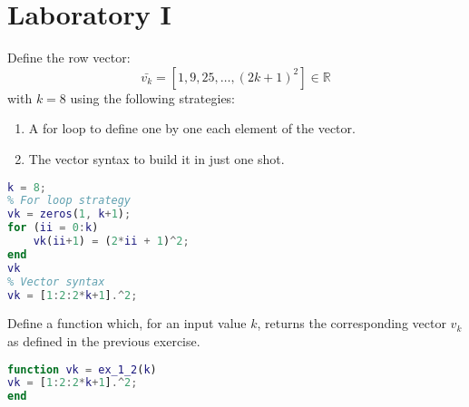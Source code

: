 \documentclass[12pt, a4paper]{report}
\newtheorem[style=M,bodystyle=\normalfont]{theorem}{Theorem}
\newtheorem[style=M,bodystyle=\normalfont]{corollary}{Corollary}
\newtheorem[style=M,bodystyle=\normalfont]{lemma}{Lemma}
\newtheorem[style=M,bodystyle=\normalfont]{definition}{Definition}
\begin{document}
\chapter{Laboratory I}
    \begin{Exercise}[label=1]
        Define the row vector: 
        \[ \bar{v_k} = [1,9,25,\dots,\left( 2k+1 \right)^2] \in \mathbb{R} \]
        with $k=8$ using the following strategies:
        \begin{enumerate}
            \item A for loop to define one by one each element of the vector.
            \item The vector syntax to build it in just one shot.
        \end{enumerate}
    \end{Exercise}
    \begin{Answer}[ref=1]
        \begin{lstlisting}[language=Matlab]
k = 8;
% For loop strategy
vk = zeros(1, k+1);
for (ii = 0:k)
    vk(ii+1) = (2*ii + 1)^2;
end
vk
% Vector syntax
vk = [1:2:2*k+1].^2;            
        \end{lstlisting}  
    \end{Answer}

    \newpage

    \begin{Exercise}[label=2]
        Define a function which, for an input value $k$, returns the corresponding vector $v_k$ as defined in the previous exercise.
    \end{Exercise}
    \begin{Answer}[ref=2]
        \begin{lstlisting}[language=Matlab]
function vk = ex_1_2(k)
vk = [1:2:2*k+1].^2;
end
        \end{lstlisting}
    \end{Answer}

    \newpage
\end{document}
